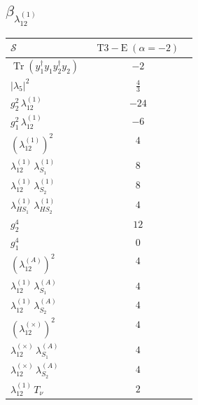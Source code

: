 \documentclass[9pt]{article}
\begin{document}
\subsection*{$ \beta_{\lambda_{12}^{(1)}} $}
\begin{longtable}{@{}p{0.31\linewidth}c@{}}
\toprule
$\mathcal{S}$ & $ \mathrm{T3-E}\;(\alpha=-2) $ \\
\midrule
$ \operatorname{Tr}(y_1^\dagger y_1y_2^\dagger y_2) $ & $ -2 $ \\
$ |\lambda_5|^2 $ & $ \frac{4}{3} $ \\
$ g_2^2\,\lambda_{12}^{(1)} $ & $ -24 $ \\
$ g_1^2\,\lambda_{12}^{(1)} $ & $ -6 $ \\
$ \left(\lambda_{12}^{(1)}\right)^2 $ & $ 4 $ \\
$ \lambda_{12}^{(1)}\,\lambda_{S_1}^{(1)} $ & $ 8 $ \\
$ \lambda_{12}^{(1)}\,\lambda_{S_2}^{(1)} $ & $ 8 $ \\
$ \lambda_{HS_1}^{(1)}\,\lambda_{HS_2}^{(1)} $ & $ 4 $ \\
$ g_2^4 $ & $ 12 $ \\
$ g_1^4 $ & $ 0 $ \\
$ \left(\lambda_{12}^{(A)}\right)^2 $ & $ 4 $ \\
$ \lambda_{12}^{(1)}\,\lambda_{S_1}^{(A)} $ & $ 4 $ \\
$ \lambda_{12}^{(1)}\,\lambda_{S_2}^{(A)} $ & $ 4 $ \\
$ \left(\lambda_{12}^{(\times)}\right)^2 $ & $ 4 $ \\
$ \lambda_{12}^{(\times)}\,\lambda_{S_1}^{(A)} $ & $ 4 $ \\
$ \lambda_{12}^{(\times)}\,\lambda_{S_2}^{(A)} $ & $ 4 $ \\
$ \lambda_{12}^{(1)}\,T_\nu $ & $ 2 $ \\
\bottomrule
\end{longtable}
\end{document}

